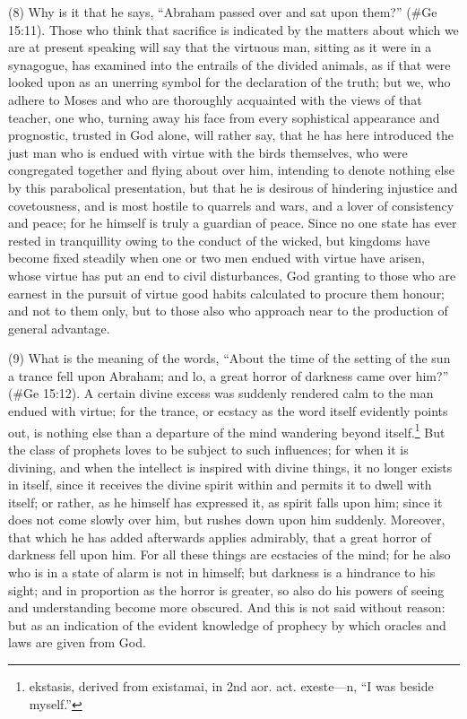 (8) Why is it that he says, ``Abraham passed over and sat upon them?'' (\#Ge 15:11). Those
who think that sacrifice is indicated by the matters about which we are at present speaking will say
that the virtuous man, sitting as it were in a synagogue, has examined into the entrails of the
divided animals, as if that were looked upon as an unerring symbol for the declaration of the truth;
but we, who adhere to Moses and who are thoroughly acquainted with the views of that teacher,
one who, turning away his face from every sophistical appearance and prognostic, trusted in God
alone, will rather say, that he has here introduced the just man who is endued with virtue with the
birds themselves, who were congregated together and flying about over him, intending to denote
nothing else by this parabolical presentation, but that he is desirous of hindering injustice and
covetousness, and is most hostile to quarrels and wars, and a lover of consistency and peace; for
he himself is truly a guardian of peace. Since no one state has ever rested in tranquillity owing to
the conduct of the wicked, but kingdoms have become fixed steadily when one or two men endued
with virtue have arisen, whose virtue has put an end to civil disturbances, God granting to those
who are earnest in the pursuit of virtue good habits calculated to procure them honour; and not to
them only, but to those also who approach near to the production of general advantage.

(9) What is the meaning of the words, ``About the time of the setting of the sun a trance fell upon
Abraham; and lo, a great horror of darkness came over him?'' (\#Ge 15:12). A certain divine
excess was suddenly rendered calm to the man endued with virtue; for the trance, or ecstacy as
the word itself evidently points out, is nothing else than a departure of the mind wandering beyond
itself.\footnote{ekstasis, derived from existamai, in 2nd aor. act. exeste—n, ``I was beside myself.''} But the class of
prophets loves to be subject to such influences; for when it is divining, and when the intellect is
inspired with divine things, it no longer exists in itself, since it receives the divine spirit within and
permits it to dwell with itself; or rather, as he himself has expressed it, as spirit falls upon him; since
it does not come slowly over him, but rushes down upon him suddenly. Moreover, that which he has
added afterwards applies admirably, that a great horror of darkness fell upon him. For all these
things are ecstacies of the mind; for he also who is in a state of alarm is not in himself; but
darkness is a hindrance to his sight; and in proportion as the horror is greater, so also do his
powers of seeing and understanding become more obscured. And this is not said without reason:
but as an indication of the evident knowledge of prophecy by which oracles and laws are given
from God.

